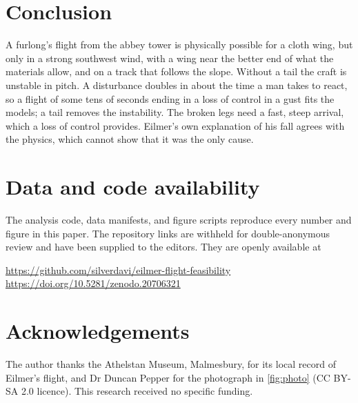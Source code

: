 \section{Conclusion}

A furlong's flight from the abbey tower is physically possible for a cloth wing, but only
in a strong southwest wind, with a wing near the better end of what the materials allow,
and on a track that follows the slope.
Without a tail the craft is unstable in pitch.
A disturbance doubles in about the time a man takes to react, so a flight of some tens of
seconds ending in a loss of control in a gust fits the models; a tail removes the
instability.
The broken legs need a fast, steep arrival, which a loss of control provides.
Eilmer's own explanation of his fall agrees with the physics, which cannot show that it was
the only cause.

\section*{Data and code availability}

The analysis code, data manifests, and figure scripts reproduce every number and figure in
this paper.
\ifdefined\anon
The repository links are withheld for double-anonymous review and have been supplied to the
editors.
\else
They are openly available at
\begin{center}
\url{https://github.com/silverdavi/eilmer-flight-feasibility}\\
\url{https://doi.org/10.5281/zenodo.20706321}
\end{center}

\section*{Acknowledgements}

The author thanks the Athelstan Museum, Malmesbury, for its local record of Eilmer's flight,
and Dr Duncan Pepper for the photograph in \cref{fig:photo} (CC BY-SA 2.0 licence).
This research received no specific funding.
\fi
